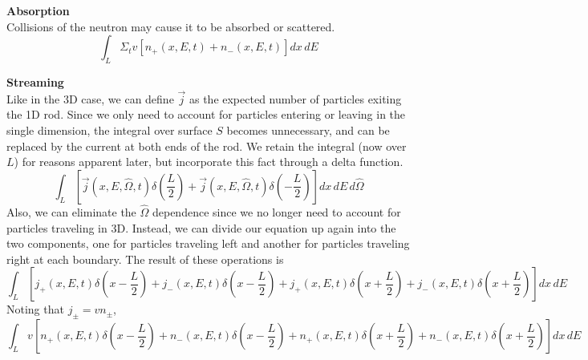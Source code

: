 \documentclass{article}
\newcommand{\Oh}{\hat{\Omega}}
\begin{document}
\textbf{Absorption}\\
Collisions of the neutron may cause it to be absorbed or scattered.
$$ \int_L \Sigma_t v \left[n_{+}(x,E,t) + n_{-}(x,E,t)\right]dx\,dE $$

\textbf{Streaming}\\
Like in the 3D case, we can define $\vec{j}$ as the expected number of particles exiting the 1D rod. Since we only need to account for particles entering or leaving in the single dimension, the integral over surface $S$ becomes unnecessary, and can be replaced by the current at both ends of the rod. We retain the integral (now over $L$) for reasons apparent later, but incorporate this fact through a delta function.
$$ \int_L \left[\vec{j}(x,E,\Oh,t)\delta(\frac{L}{2}) + \vec{j}(x,E,\Oh,t)\delta(-\frac{L}{2})\right]dx\,dE\,d\Oh $$
Also, we can eliminate the $\Oh$ dependence since we no longer need to account for particles traveling in 3D. Instead, we can divide our equation up again into the two components, one for particles traveling left and another for particles traveling right at each boundary. The result of these operations is
$$ \int_L \left[j_{+}(x,E,t)\delta(x-\frac{L}{2}) + j_{-}(x,E,t)\delta(x-\frac{L}{2}) + j_{+}(x,E,t)\delta(x+\frac{L}{2}) + j_{-}(x,E,t)\delta(x+\frac{L}{2})\right]dx\,dE $$
Noting that $j_{\pm} = vn_{\pm}$,
$$ \int_L v \left[n_{+}(x,E,t)\delta(x-\frac{L}{2}) + n_{-}(x,E,t)\delta(x-\frac{L}{2}) + n_{+}(x,E,t)\delta(x+\frac{L}{2}) + n_{-}(x,E,t)\delta(x+\frac{L}{2})\right]dx\,dE $$
\end{document}
